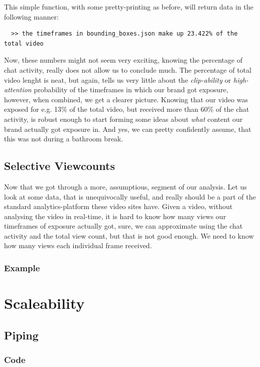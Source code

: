 \documentclass{article}
\begin{document}
This simple function, with some pretty-printing as before, will return data
in the following manner:
\begin{verbatim}
  >> the timeframes in bounding_boxes.json make up 23.422% of the total video
\end{verbatim}

Now, these numbers might not seem very exciting, knowing the percentage of chat activity, really does not allow
us to conclude much. The percentage of total video lenght is neat, but again, tells us very little
about the \textit{clip-ability} or \textit{high-attention} probability of the timeframes
in which our brand got exposure, however, when combined, we get a clearer picture.
\newline\newline
Knowing that our video was exposed for e.g. 13\% of the total video, but received
more than 60\% of the chat activity, is robust enough to start forming some
ideas about \textit{what} content our brand actually got exposure in. And yes,
we can pretty confidently assume, that this was not during a bathroom break.


\subsection{Selective Viewcounts}
Now that we got through a more, assumptious, segment of our analysis. Let us
look at some data, that is unequivocally useful, and really should be a part
of the standard analytics-platform these video sites have.
\newline\newline
Given a video, without analysing the video in real-time, it is hard to know
how many views our timeframes of exposure actually got, sure, we can approximate
using the chat activity and the total view count, but that is not good enough. We need
to know how many views each individual frame received.
\subsubsection{Example}

\section{Scaleability}
\subsection{Piping}
\subsubsection{Code}
\end{document}
